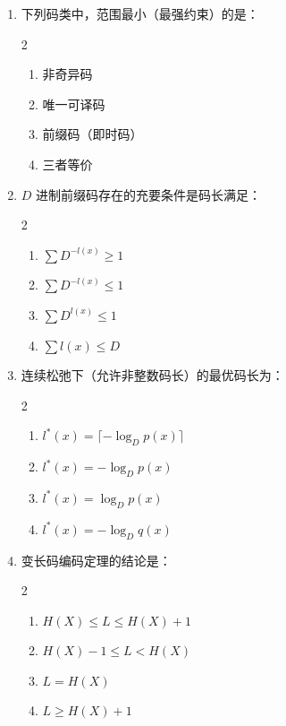 \documentclass[12pt,a4paper]{ctexart}
\begin{document}
\begin{enumerate}[label=\arabic*., leftmargin=*]

\item 下列码类中，范围最小（最强约束）的是：
\begin{multicols}{2}
\begin{enumerate}[label=(\Alph*)]
  \item 非奇异码
  \item 唯一可译码
  \item 前缀码（即时码）
  \item 三者等价
\end{enumerate}
\end{multicols}

\item $D$ 进制前缀码存在的充要条件是码长满足：
\begin{multicols}{2}
\begin{enumerate}[label=(\Alph*)]
  \item $\sum D^{-l(x)} \geq 1$
  \item $\sum D^{-l(x)} \leq 1$
  \item $\sum D^{l(x)} \leq 1$
  \item $\sum l(x) \leq D$
\end{enumerate}
\end{multicols}

\item 连续松弛下（允许非整数码长）的最优码长为：
\begin{multicols}{2}
\begin{enumerate}[label=(\Alph*)]
  \item $l^*(x) = \lceil -\log_D p(x) \rceil$
  \item $l^*(x) = -\log_D p(x)$
  \item $l^*(x) = \log_D p(x)$
  \item $l^*(x) = -\log_D q(x)$
\end{enumerate}
\end{multicols}

\item 变长码编码定理的结论是：
\begin{multicols}{2}
\begin{enumerate}[label=(\Alph*)]
  \item $H(X) \leq L \leq H(X)+1$
  \item $H(X)-1 \leq L < H(X)$
  \item $L = H(X)$
  \item $L \geq H(X)+1$
\end{enumerate}
\end{multicols}


\end{enumerate}
\end{document}
